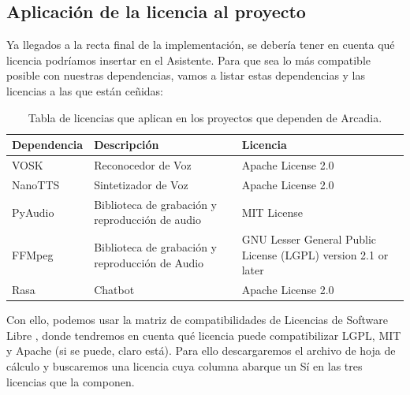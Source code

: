 \subsection{Aplicación de la licencia al proyecto}
Ya llegados a la recta final de la implementación, se debería tener en cuenta qué licencia podríamos insertar en el Asistente. Para que sea lo más compatible posible con nuestras dependencias, vamos a listar estas dependencias y las licencias a las que están ceñidas:

\begin{center}
	\begin{table}[H]
		\centering
		\begin{tabularx}{\textwidth}{|l|X|X|}
			\hline
			{\cellcolor{lightblue}}\textbf{Dependencia} & {\cellcolor{lightblue}}\textbf{Descripción} & {\cellcolor{lightblue}}\textbf{Licencia} \\
			\hline
			VOSK & Reconocedor de Voz & Apache License 2.0 \\ \hline
			NanoTTS & Sintetizador de Voz & Apache License 2.0  \\ \hline
			PyAudio & Biblioteca de grabación y reproducción de audio & MIT License \\ \hline
			FFMpeg & Biblioteca de grabación y reproducción de Audio & GNU Lesser General Public License (LGPL) version 2.1 or later \\  \hline
			Rasa & Chatbot & Apache License 2.0 \\ \hline
		\end{tabularx}
		\caption{Tabla de licencias que aplican en los proyectos que dependen de Arcadia.}
	\end{table}
\end{center}

Con ello, podemos usar la matriz de compatibilidades de Licencias de Software Libre \cite{matriz-licencias}, donde tendremos en cuenta qué licencia puede compatibilizar LGPL, MIT y Apache (si se puede, claro está). Para ello descargaremos el archivo de hoja de cálculo y buscaremos una licencia cuya columna abarque un Sí en las tres licencias que la componen.

